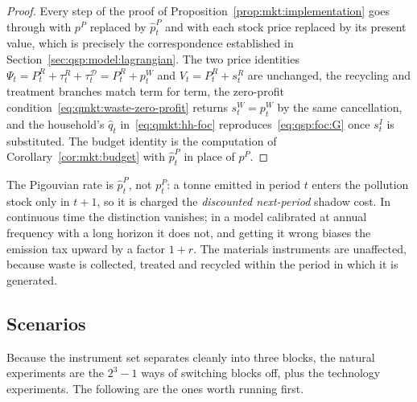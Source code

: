 \begin{proof}
Every step of the proof of Proposition~\ref{prop:mkt:implementation} goes through with $p^P$ replaced
by $\hat p^P_t$ and with each stock price replaced by its present value, which is precisely the
correspondence established in Section~\ref{sec:qsp:model:lagrangian}. The two price identities
$\Psi_t=P^R_t+\tau^R_t+\tau^{\mathcal D}_t=P^R_t+p^W_t$ and $V_t=P^R_t+s^R_t$ are unchanged, the
recycling and treatment branches match term for term, the zero-profit
condition~\eqref{eq:qmkt:waste-zero-profit} returns $s^W_t=p^W_t$ by the same cancellation, and the
household's $\hat q_t$ in~\eqref{eq:qmkt:hh-foc} reproduces~\eqref{eq:qsp:foc:G} once $s^I_t$ is
substituted. The budget identity is the computation of Corollary~\ref{cor:mkt:budget} with $\hat p^P_t$
in place of $p^P$.
\end{proof}

 The Pigouvian rate is $\hat p^P_t$, not $p^P_t$: a
tonne emitted in period $t$ enters the pollution stock only in $t+1$, so it is charged the
\emph{discounted next-period} shadow cost. In continuous time the distinction vanishes; in a model
calibrated at annual frequency with a long horizon it does not, and getting it wrong biases the
emission tax upward by a factor $1+r$. The materials instruments are unaffected, because waste is
collected, treated and recycled within the period in which it is generated.

\subsection{Scenarios}\label{sec:qmkt:scenarios}

Because the instrument set separates cleanly into three blocks, the natural experiments are the
$2^3-1$ ways of switching blocks off, plus the technology experiments. The following are the ones worth
running first.

